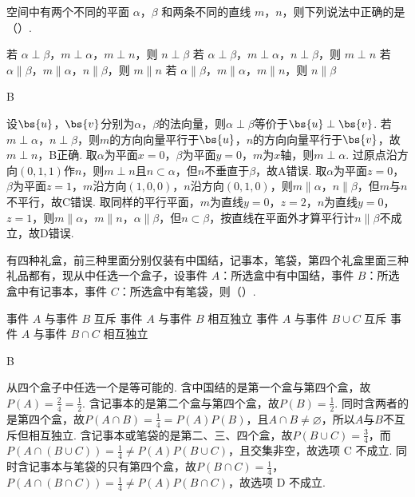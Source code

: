 \begin{problem}
空间中有两个不同的平面 \(\alpha\)，\(\beta\) 和两条不同的直线 \(m\)，\(n\)，则下列说法中正确的是（\quad）.

\choices
    {若 \(\alpha\perp\beta\)，\(m\perp\alpha\)，\(m\perp n\)，则 \(n\perp\beta\)}
    {若 \(\alpha\perp\beta\)，\(m\perp\alpha\)，\(n\perp\beta\)，则 \(m\perp n\)}
    {若 \(\alpha\parallel\beta\)，\(m\parallel\alpha\)，\(n\parallel\beta\)，则 \(m\parallel n\)}
    {若 \(\alpha\parallel\beta\)，\(m\parallel\alpha\)，\(m\parallel n\)，则 \(n\parallel\beta\)}
\end{problem}

\begin{answer}
B
\end{answer}

\begin{solution}
设\(\bs{u}\)，\(\bs{v}\)分别为\(\alpha\)，\(\beta\)的法向量，则\(\alpha\perp\beta\)等价于\(\bs{u}\perp\bs{v}\). 若\(m\perp\alpha\)，\(n\perp\beta\)，则\(m\)的方向向量平行于\(\bs{u}\)，\(n\)的方向向量平行于\(\bs{v}\)，故\(m\perp n\)，B正确. 取\(\alpha\)为平面\(x=0\)，\(\beta\)为平面\(y=0\)，\(m\)为\(x\)轴，则\(m\perp\alpha\). 过原点沿方向\((0,1,1)\)作\(n\)，则\(m\perp n\)且\(n\subset\alpha\)，但\(n\)不垂直于\(\beta\)，故A错误. 取\(\alpha\)为平面\(z=0\)，\(\beta\)为平面\(z=1\)，\(m\)沿方向\((1,0,0)\)，\(n\)沿方向\((0,1,0)\)，则\(m\parallel\alpha\)，\(n\parallel\beta\)，但\(m\)与\(n\)不平行，故C错误. 取同样的平行平面，\(m\)为直线\(y=0\)，\(z=2\)，\(n\)为直线\(y=0\)，\(z=1\)，则\(m\parallel\alpha\)，\(m\parallel n\)，\(\alpha\parallel\beta\)，但\(n\subset\beta\)，按直线在平面外才算平行计\(n\parallel\beta\)不成立，故D错误.
\end{solution}

\begin{problem}
有四种礼盒，前三种里面分别仅装有中国结，记事本，笔袋，第四个礼盒里面三种礼品都有，现从中任选一个盒子，设事件 \(A\)：所选盒中有中国结，事件 \(B\)：所选盒中有记事本，事件 \(C\)：所选盒中有笔袋，则（\quad）.

\choices
    {事件 \(A\) 与事件 \(B\) 互斥}
    {事件 \(A\) 与事件 \(B\) 相互独立}
    {事件 \(A\) 与事件 \(B\cup C\) 互斥}
    {事件 \(A\) 与事件 \(B\cap C\) 相互独立}
\end{problem}

\begin{answer}
B
\end{answer}

\begin{solution}
从四个盒子中任选一个是等可能的. 含中国结的是第一个盒与第四个盒，故\(P(A)=\frac{2}{4}=\frac{1}{2}\). 含记事本的是第二个盒与第四个盒，故\(P(B)=\frac{1}{2}\). 同时含两者的是第四个盒，故\(P(A\cap B)=\frac{1}{4}=P(A)P(B)\)，且\(A\cap B\ne\varnothing\)，所以\(A\)与\(B\)不互斥但相互独立. 含记事本或笔袋的是第二、三、四个盒，故\(P(B\cup C)=\frac{3}{4}\)，而\(P(A\cap(B\cup C))=\frac{1}{4}\ne P(A)P(B\cup C)\)，且交集非空，故选项 C 不成立. 同时含记事本与笔袋的只有第四个盒，故\(P(B\cap C)=\frac{1}{4}\)，\(P(A\cap(B\cap C))=\frac{1}{4}\ne P(A)P(B\cap C)\)，故选项 D 不成立.
\end{solution}

